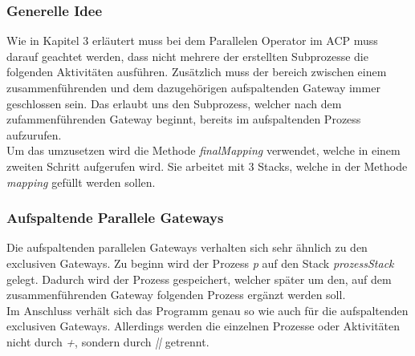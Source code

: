 \subsubsection{Generelle Idee}\label{Generelle Idee}
Wie in Kapitel 3 erläutert muss bei dem Parallelen Operator im ACP muss darauf geachtet werden, dass nicht mehrere der erstellten Subprozesse die folgenden Aktivitäten ausführen. Zusätzlich muss der bereich zwischen einem zusammenführenden und dem dazugehörigen aufspaltenden Gateway immer geschlossen sein. Das erlaubt uns den Subprozess, welcher nach dem zufammenführenden Gateway beginnt, bereits im aufspaltenden Prozess aufzurufen.\\
Um das umzusetzen wird die Methode \textit{finalMapping} verwendet, welche in einem zweiten Schritt aufgerufen wird. Sie arbeitet mit 3 Stacks, welche in der Methode \textit{mapping} gefüllt werden sollen.\\
\subsubsection{Aufspaltende Parallele Gateways}\label{Aufspaltende Parallele Gateways}
Die aufspaltenden parallelen Gateways verhalten sich sehr ähnlich zu den exclusiven Gateways. Zu beginn wird der Prozess \textit{p} auf den Stack \textit{prozessStack} gelegt. Dadurch wird der Prozess gespeichert, welcher später um den, auf dem zusammenführenden Gateway folgenden Prozess ergänzt werden soll.\\
Im Anschluss verhält sich das Programm genau so wie auch für die aufspaltenden exclusiven Gateways. Allerdings werden die einzelnen Prozesse oder Aktivitäten nicht durch \textit{+}, sondern durch \textit{||} getrennt.

